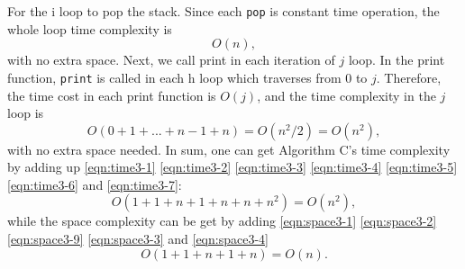 \documentclass[natbib,12pt]{article}
\begin{document}
	For the i loop to pop the stack. Since each {\tt pop} is constant time operation, the whole loop time complexity is
	\begin{equation}
	O(n), \label{eqn:time3-6}
	\end{equation}
	with no extra space.
	Next, we call print in each iteration of $j$ loop. In the print function, {\tt print} is called in each h loop which traverses from $0$ to $j$. Therefore, the time cost in each print function is $O(j)$, and the time complexity in the $j$ loop is
	\begin{equation}
		O(0 + 1 + ... + n-1  + n) = O ( n^2 / 2 ) = O(n^2), \label{eqn:time3-7}
	\end{equation}
	with no extra space needed.
	In sum, one can get Algorithm C's time complexity by adding up \eqref{eqn:time3-1} \eqref{eqn:time3-2} \eqref{eqn:time3-3} \eqref{eqn:time3-4} \eqref{eqn:time3-5} \eqref{eqn:time3-6} and \eqref{eqn:time3-7}:
	\begin{equation}
		O(1 + 1 + n + 1 + n + n + n^2) = O(n^2),
	\end{equation}
	while the space complexity can be get by adding \eqref{eqn:space3-1} \eqref{eqn:space3-2}  \eqref{eqn:space3-9} \eqref{eqn:space3-3} and \eqref{eqn:space3-4}
	\begin{equation}
		O(1 + 1 + n + 1 + n) = O(n).
	\end{equation}
	
	
\end{document}
